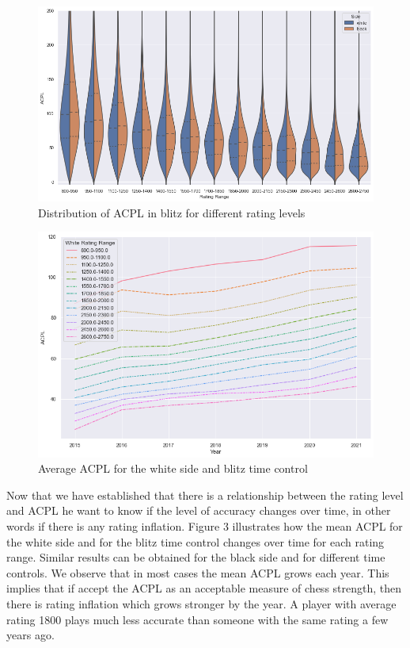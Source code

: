 \documentclass{article}
\begin{document}
\begin{figure}
  \centering
  \includegraphics[width=0.9\linewidth, keepaspectratio]{images/Fig-2.png}
  \caption{Distribution of ACPL in blitz for different rating levels}
\end{figure}
\begin{figure}
  \centering
  \includegraphics[width=\linewidth]{images/Fig-3.png}
  \caption{Average ACPL for the white side and blitz time control}
\end{figure}

Now that we have established that there is a relationship between the rating level and ACPL he want to know if the level of accuracy changes over time, in other words if there is any rating inflation. Figure 3 illustrates how the mean ACPL for the white side and for the blitz time control changes over time for each rating range. Similar results can be obtained for the black side and for different time controls. We observe that in most cases the mean ACPL grows each year. This implies that if accept the ACPL as an acceptable measure of chess strength, then there is rating inflation which grows stronger by the year. A player with average rating 1800 plays much less accurate than someone with the same rating a few years ago. 
\end{document}
